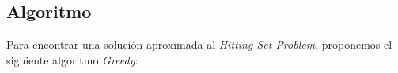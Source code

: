 \subsection{Algoritmo}

Para encontrar una soluci\'on aproximada al \textit{Hitting-Set Problem},
proponemos el siguiente algoritmo \textit{Greedy}:


